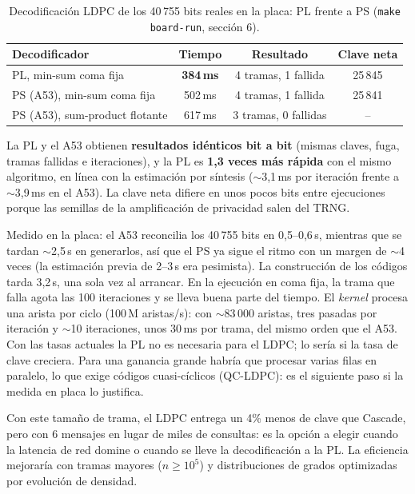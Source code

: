 \documentclass[a4paper,11pt]{article}
\newcommand{\code}[1]{\texttt{#1}}
\begin{document}
\begin{table}[htbp]
\centering
\caption{Decodificación LDPC de los 40\,755 bits reales en la placa: PL frente a PS (\code{make board-run}, sección 6).}
\begin{tabular}{lccc}
\toprule
Decodificador & Tiempo & Resultado & Clave neta \\
\midrule
PL, min-sum coma fija & \textbf{384\,ms} & 4 tramas, 1 fallida & 25\,845 \\
PS (A53), min-sum coma fija & 502\,ms & 4 tramas, 1 fallida & 25\,841 \\
PS (A53), sum-product flotante & 617\,ms & 3 tramas, 0 fallidas & -- \\
\bottomrule
\end{tabular}
\end{table}

\noindent
La PL y el A53 obtienen \textbf{resultados idénticos bit a bit} (mismas claves, fuga, tramas fallidas e
iteraciones), y la PL es \textbf{1,3 veces más rápida} con el mismo algoritmo, en línea con la estimación por
síntesis ($\sim$3,1\,ms por iteración frente a $\sim$3,9\,ms en el A53). La clave neta difiere en unos pocos
bits entre ejecuciones porque las semillas de la amplificación de privacidad salen del TRNG.

\noindent
Medido en la placa: el A53 reconcilia los 40\,755 bits en 0,5--0,6\,s, mientras que se tardan $\sim$2,5\,s
en generarlos, así que el PS ya sigue el ritmo con un margen de $\sim$4 veces (la estimación previa de
2--3\,s era pesimista). La construcción de los códigos tarda 3,2\,s, una sola vez al arrancar. En la
ejecución en coma fija, la trama que falla agota las 100 iteraciones y se lleva buena parte del tiempo.
El \emph{kernel} procesa una arista por ciclo (100\,M aristas/s): con $\sim$83\,000 aristas, tres pasadas
por iteración y $\sim$10 iteraciones, unos 30\,ms por trama, del mismo orden que el A53. Con las tasas
actuales la PL no es necesaria para el LDPC; lo sería si la tasa de clave creciera. Para una ganancia grande
habría que procesar varias filas en paralelo, lo que exige códigos cuasi-cíclicos (QC-LDPC): es el
siguiente paso si la medida en placa lo justifica.

\noindent
Con este tamaño de trama, el LDPC entrega un 4\% menos de clave que Cascade, pero con 6 mensajes en lugar
de miles de consultas: es la opción a elegir cuando la latencia de red domine o cuando se lleve la
decodificación a la PL. La eficiencia mejoraría con tramas mayores ($n \geq 10^5$) y distribuciones de grados
optimizadas por evolución de densidad.
\end{document}
